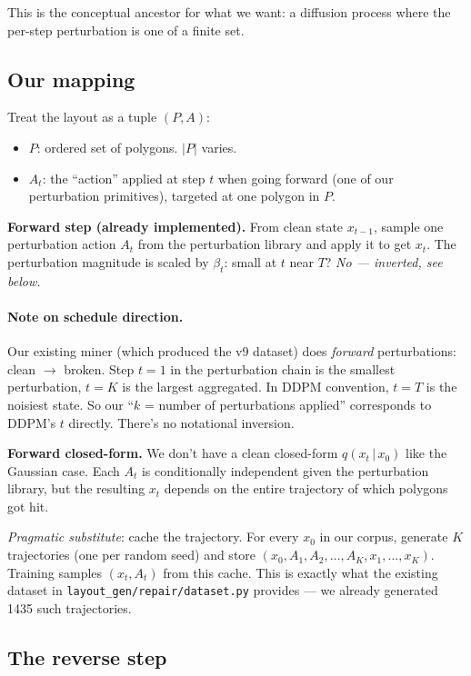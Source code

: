 \documentclass[11pt,a4paper]{article}
\newcommand{\given}{\,|\,}
\begin{document}
This is the conceptual ancestor for what we want: a diffusion process
where the per-step perturbation is one of a finite set.

\subsection{Our mapping}

Treat the layout as a tuple $(P, A)$:
\begin{itemize}[leftmargin=*]
\item $P$: ordered set of polygons. $|P|$ varies.
\item $A_t$: the ``action'' applied at step $t$ when going forward (one of
  our perturbation primitives), targeted at one polygon in $P$.
\end{itemize}

\textbf{Forward step (already implemented).} From clean state $x_{t-1}$,
sample one perturbation action $A_t$ from the perturbation library and
apply it to get $x_t$. The perturbation magnitude is scaled by $\beta_t$:
small at $t$ near $T$? \emph{No --- inverted, see below.}

\paragraph{Note on schedule direction.} Our existing miner (which produced
the v9 dataset) does \emph{forward} perturbations: clean $\to$ broken.
Step $t = 1$ in the perturbation chain is the smallest perturbation, $t = K$
is the largest aggregated. In DDPM convention, $t = T$ is the noisiest
state. So our ``$k$ = number of perturbations applied'' corresponds to
DDPM's $t$ directly. There's no notational inversion.

\textbf{Forward closed-form.} We don't have a clean closed-form
$q(x_t \given x_0)$ like the Gaussian case. Each $A_t$ is conditionally
independent given the perturbation library, but the resulting $x_t$
depends on the entire trajectory of which polygons got hit.

\emph{Pragmatic substitute}: cache the trajectory. For every $x_0$ in
our corpus, generate $K$ trajectories (one per random seed) and store
$(x_0, A_1, A_2, \ldots, A_K, x_1, \ldots, x_K)$. Training samples
$(x_t, A_t)$ from this cache. This is exactly what the existing dataset
in \texttt{layout\_gen/repair/dataset.py} provides --- we already
generated 1435 such trajectories.

\subsection{The reverse step}
\end{document}
